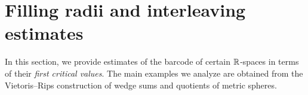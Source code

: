 
\section{Filling radii and interleaving estimates}\label{s:computations}

In this section, we provide estimates of the barcode of certain $\mathbb{R}$-spaces in terms of their \textit{first critical values}. 
The main examples we analyze are obtained from the Vietoris--Rips construction of wedge sums and quotients of metric spheres.




